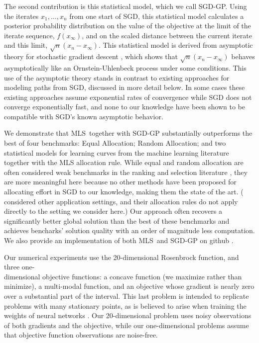 \documentclass[12pt,english]{article}
\newcommand{\abbrv}{MLS}
\begin{document}
The second contribution is this statistical model, which we call SGD-GP.  Using the iterates $x_1,\ldots,x_n$ from one start of SGD, this statistical model calculates a posterior probability distribution on the value of the objective at the limit of the iterate sequence, $f(x_\infty)$, and on the scaled distance between the current iterate and this limit, $\sqrt{n}(x_n - x_\infty)$.
This statistical model is derived from asymptotic theory for stochastic gradient descent \citep{kushner}, which shows 
that $\sqrt{n}(x_{n}-x_{\infty})$ behaves asymptotically like an Ornstein-Uhlenbeck process under some conditions.
This use of the asymptotic theory stands in contrast to existing approaches for modeling paths from SGD, discussed in more detail below. In some cases these existing approaches assume exponential rates of convergence while SGD does not converge exponentially fast, and none to our knowledge have been shown to be compatible with SGD's known asymptotic behavior.


We demonstrate that \abbrv\ together with SGD-GP substantially outperforms the best of four benchmarks:
Equal Allocation;
Random Allocation;
and two statistical models for learning curves from the machine learning literature \citep{Swersky:2014,Hutter:2015}
together with the MLS allocation rule.
While equal and random allocation are often considered weak benchmarks in the ranking and selection literature \citep{kim:20062}, they are more meaningful here because no other methods have been proposed for allocating effort in SGD 
to our knowledge,
making them the state of the art.  (\cite{Swersky:2014,Hutter:2015} considered other application settings, and their allocation rules do not apply directly to the setting we consider here.)
Our approach often recovers a significantly better global solution than the best of these benchmarks 
and achieves bencharks' solution quality with an order of magnitude less computation. We also provide an implementation of both \abbrv\ and SGD-GP on github \citep{MLS}.

Our numerical experiments use the 20-dimensional Rosenbrock function, and three one-\\dimensional objective functions: a concave function (we maximize rather than minimize), a multi-modal function, and an objective whose gradient is nearly zero over a substantial part of the interval.  This last problem is intended to replicate problems with many stationary points, as is believed to arise when training the weights of neural networks \citep{yoshua94}.
Our 20-dimensional problem uses noisy observations of both gradients and the objective, while our one-dimensional problems assume that objective function observations are noise-free. 
\end{document}
